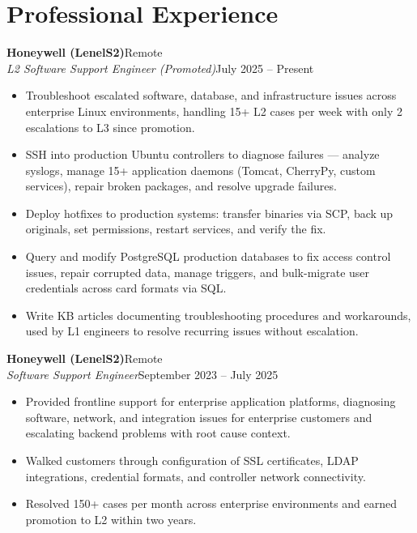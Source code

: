 \documentclass[9.5pt, letterpaper]{extarticle}
\newcommand{\roleheader}[4]{%
  \vspace{4pt}
  \noindent\textbf{#1}\hfill#2\\
  \textit{#3}\hfill#4
  \vspace{1pt}
}
\begin{document}
\section{Professional Experience}

\roleheader{Honeywell (LenelS2)}{Remote}{L2 Software Support Engineer (Promoted)}{July 2025 -- Present}
\begin{itemize}
  \item Troubleshoot escalated software, database, and infrastructure issues across enterprise Linux environments, handling 15+ L2 cases per week with only 2 escalations to L3 since promotion.
  \item SSH into production Ubuntu controllers to diagnose failures --- analyze syslogs, manage 15+ application daemons (Tomcat, CherryPy, custom services), repair broken packages, and resolve upgrade failures.
  \item Deploy hotfixes to production systems: transfer binaries via SCP, back up originals, set permissions, restart services, and verify the fix.
  \item Query and modify PostgreSQL production databases to fix access control issues, repair corrupted data, manage triggers, and bulk-migrate user credentials across card formats via SQL.
  \item Write KB articles documenting troubleshooting procedures and workarounds, used by L1 engineers to resolve recurring issues without escalation.
\end{itemize}

\roleheader{Honeywell (LenelS2)}{Remote}{Software Support Engineer}{September 2023 -- July 2025}
\begin{itemize}
  \item Provided frontline support for enterprise application platforms, diagnosing software, network, and integration issues for enterprise customers and escalating backend problems with root cause context.
  \item Walked customers through configuration of SSL certificates, LDAP integrations, credential formats, and controller network connectivity.
  \item Resolved 150+ cases per month across enterprise environments and earned promotion to L2 within two years.
\end{itemize}
\end{document}
